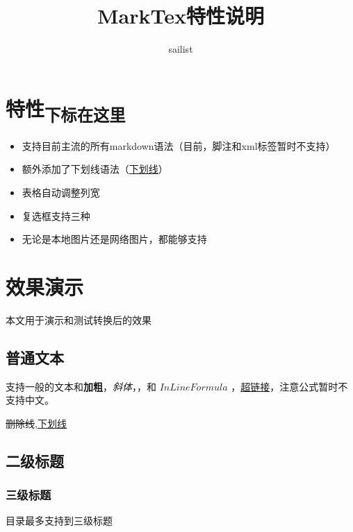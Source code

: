 \documentclass{article}
\title{MarkTex特性说明}
\author{sailist}
\begin{document}
\normalsize
\maketitle
\tableofcontents
\newpage









\section{特性\textsubscript{下标在这里}}


\begin{itemize}
\item
支持目前主流的所有markdown语法（目前，脚注和xml标签暂时不支持）
\item
额外添加了下划线语法（\underline{下划线}）
\item
表格自动调整列宽
\item
复选框支持三种
\item
无论是本地图片还是网络图片，都能够支持
\end{itemize}



\section{效果演示}




本文用于演示和测试转换后的效果


\subsection{普通文本}


支持一般的文本和\textbf{加粗}，\textit{斜体}，，和 $InLine Formula$ ，\href{http://github.com}{超链接}，注意公式暂时不支持中文。


\sout{删除线},\underline{下划线}


\subsection{二级标题}




\subsubsection{三级标题}


目录最多支持到三级标题
\end{document}
